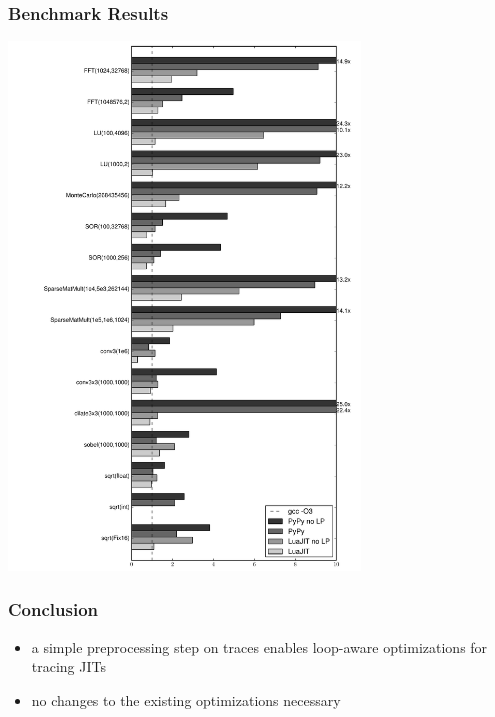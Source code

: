 \documentclass[utf8x]{beamer}
\begin{document}
\begin{frame}
  \frametitle{Benchmark Results}
  \includegraphics[width=0.7\textwidth,angle=90]{../benchmarks/result}
\end{frame}

\begin{frame}
  \frametitle{Conclusion}
  \begin{itemize}
      \item a simple preprocessing step on traces enables loop-aware optimizations for tracing JITs
      \item no changes to the existing optimizations necessary
  \end{itemize}
\end{frame}
\end{document}
